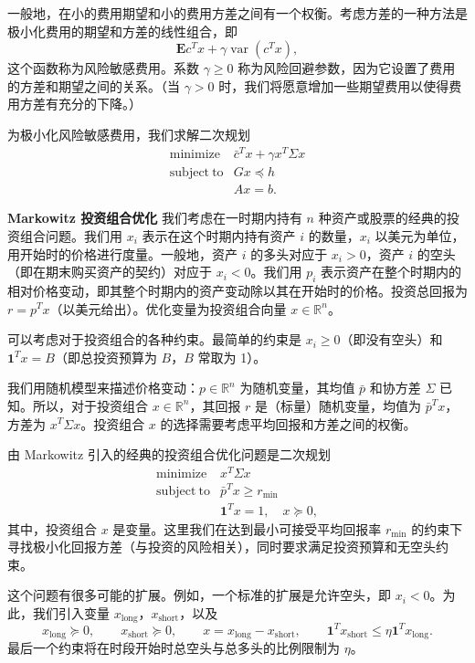 \documentclass[UTF8,12pt,a4paper,fontset=fandol]{ctexart}
\begin{document}
一般地，在小的费用期望和小的费用方差之间有一个权衡。考虑方差的一种方法是极小化费用的期望和方差的线性组合，即
\[
\mathbf{E}c^Tx+\gamma\operatorname{var}(c^Tx),
\]
这个函数称为风险敏感费用。系数 $\gamma\geq 0$ 称为风险回避参数，因为它设置了费用的方差和期望之间的关系。（当 $\gamma>0$ 时，我们将愿意增加一些期望费用以使得费用方差有充分的下降。）

为极小化风险敏感费用，我们求解二次规划
\[
\begin{array}{ll}
\mathop{\mathrm{minimize}} & \bar c^Tx+\gamma x^T\Sigma x\\
\mathrm{subject\ to} & Gx\preceq h\\
& Ax=b.
\end{array}
\]

\noindent\textbf{Markowitz 投资组合优化}\quad
我们考虑在一时期内持有 $n$ 种资产或股票的经典的投资组合问题。我们用 $x_i$ 表示在这个时期内持有资产 $i$ 的数量，$x_i$ 以美元为单位，用开始时的价格进行度量。一般地，资产 $i$ 的多头对应于 $x_i>0$，资产 $i$ 的空头（即在期末购买资产的契约）对应于 $x_i<0$。我们用 $p_i$ 表示资产在整个时期内的相对价格变动，即其整个时期内的资产变动除以其在开始时的价格。投资总回报为 $r=p^Tx$（以美元给出）。优化变量为投资组合向量 $x\in\mathbb{R}^n$。

可以考虑对于投资组合的各种约束。最简单的约束是 $x_i\geq 0$（即没有空头）和 $\mathbf{1}^Tx=B$（即总投资预算为 $B$，$B$ 常取为 1）。

我们用随机模型来描述价格变动：$p\in\mathbb{R}^n$ 为随机变量，其均值 $\bar p$ 和协方差 $\Sigma$ 已知。所以，对于投资组合 $x\in\mathbb{R}^n$，其回报 $r$ 是（标量）随机变量，均值为 $\bar p^Tx$，方差为 $x^T\Sigma x$。投资组合 $x$ 的选择需要考虑平均回报和方差之间的权衡。

由 Markowitz 引入的经典的投资组合优化问题是二次规划
\[
\begin{array}{ll}
\mathop{\mathrm{minimize}} & x^T\Sigma x\\
\mathrm{subject\ to} & \bar p^Tx\geq r_{\min}\\
& \mathbf{1}^Tx=1,\quad x\succeq 0,
\end{array}
\]
其中，投资组合 $x$ 是变量。这里我们在达到最小可接受平均回报率 $r_{\min}$ 的约束下寻找极小化回报方差（与投资的风险相关），同时要求满足投资预算和无空头约束。

这个问题有很多可能的扩展。例如，一个标准的扩展是允许空头，即 $x_i<0$。为此，我们引入变量 $x_{\mathrm{long}}$，$x_{\mathrm{short}}$，以及
\[
x_{\mathrm{long}}\succeq 0,\qquad
x_{\mathrm{short}}\succeq 0,\qquad
x=x_{\mathrm{long}}-x_{\mathrm{short}},\qquad
\mathbf{1}^Tx_{\mathrm{short}}\leq \eta\mathbf{1}^Tx_{\mathrm{long}}.
\]
最后一个约束将在时段开始时总空头与总多头的比例限制为 $\eta$。
\end{document}
